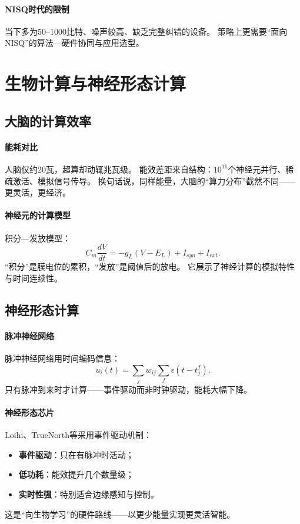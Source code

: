 \paragraph{NISQ时代的限制}
当下多为50–1000比特、噪声较高、缺乏完整纠错的设备。  
策略上更需要“面向NISQ”的算法—硬件协同与应用选型。



\section{生物计算与神经形态计算}

\subsection{大脑的计算效率}

\paragraph{能耗对比}
人脑仅约20瓦，超算却动辄兆瓦级。  
能效差距来自结构：$10^{11}$个神经元并行、稀疏激活、模拟信号传导。  
换句话说，同样能量，大脑的“算力分布”截然不同——\;更灵活，更经济。

\paragraph{神经元的计算模型}
积分—发放模型：
$$C_m\dfrac{dV}{dt}=-g_L(V-E_L)+I_{syn}+I_{ext}.$$
“积分”是膜电位的累积，“发放”是阈值后的放电。  
它展示了神经计算的模拟特性与时间连续性。

\subsection{神经形态计算}

\paragraph{脉冲神经网络}
脉冲神经网络用时间编码信息：
$$u_i(t)=\sum_jw_{ij}\sum_f\epsilon(t-t_j^f).$$
只有脉冲到来时才计算——\;事件驱动而非时钟驱动，能耗大幅下降。

\paragraph{神经形态芯片}
Loihi、TrueNorth等采用事件驱动机制：  
\begin{itemize}
\item \textbf{事件驱动}：只在有脉冲时活动；
\item \textbf{低功耗}：能效提升几个数量级；
\item \textbf{实时性强}：特别适合边缘感知与控制。
\end{itemize}
这是“向生物学习”的硬件路线——\;以更少能量实现更灵活智能。

